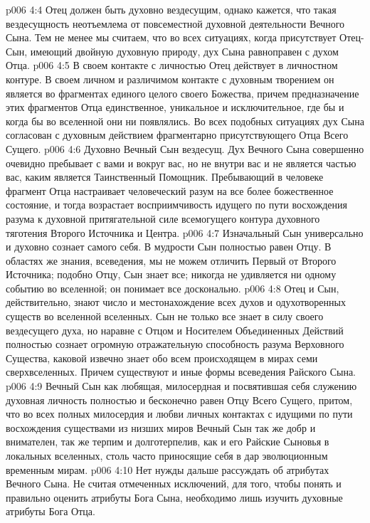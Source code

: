 \vs p006 4:4 Отец должен быть духовно вездесущим, однако кажется, что такая вездесущность неотъемлема от повсеместной духовной деятельности Вечного Сына. Тем не менее мы считаем, что во всех ситуациях, когда присутствует Отец\hyp{}Сын, имеющий двойную духовную природу, дух Сына равноправен с духом Отца.
\vs p006 4:5 В своем контакте с личностью Отец действует в личностном контуре. В своем личном и различимом контакте с духовным творением он является во фрагментах единого целого своего Божества, причем предназначение этих фрагментов Отца единственное, уникальное и исключительное, где бы и когда бы во вселенной они ни появлялись. Во всех подобных ситуациях дух Сына согласован с духовным действием фрагментарно присутствующего Отца Всего Сущего.
\vs p006 4:6 Духовно Вечный Сын вездесущ. Дух Вечного Сына совершенно очевидно пребывает с вами и вокруг вас, но не внутри вас и не является частью вас, каким является Таинственный Помощник. Пребывающий в человеке фрагмент Отца настраивает человеческий разум на все более божественное состояние, и тогда возрастает восприимчивость идущего по пути восхождения разума к духовной притягательной силе всемогущего контура духовного тяготения Второго Источника и Центра.
\vs p006 4:7 \pc Изначальный Сын универсально и духовно сознает самого себя. В мудрости Сын полностью равен Отцу. В областях же знания, всеведения, мы не можем отличить Первый от Второго Источника; подобно Отцу, Сын знает все; никогда не удивляется ни одному событию во вселенной; он понимает все досконально.
\vs p006 4:8 \pc Отец и Сын, действительно, знают число и местонахождение всех духов и одухотворенных существ во вселенной вселенных. Сын не только все знает в силу своего вездесущего духа, но наравне с Отцом и Носителем Объединенных Действий полностью сознает огромную отражательную способность разума Верховного Существа, каковой извечно знает обо всем происходящем в мирах семи сверхвселенных. Причем существуют и иные формы всеведения Райского Сына.
\vs p006 4:9 \pc Вечный Сын как любящая, милосердная и посвятившая себя служению духовная личность полностью и бесконечно равен Отцу Всего Сущего, притом, что во всех полных милосердия и любви личных контактах с идущими по пути восхождения существами из низших миров Вечный Сын так же добр и внимателен, так же терпим и долготерпелив, как и его Райские Сыновья в локальных вселенных, столь часто приносящие себя в дар эволюционным временным мирам.
\vs p006 4:10 Нет нужды дальше рассуждать об атрибутах Вечного Сына. Не считая отмеченных исключений, для того, чтобы понять и правильно оценить атрибуты Бога Сына, необходимо лишь изучить духовные атрибуты Бога Отца.

